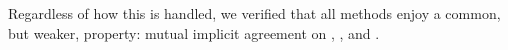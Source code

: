 \documentclass[runningheads, envcountsame, hidelinks, a4paper, draft, x11names]{llncs}
\begin{document}
Regardless of how this is handled, we verified that all methods
enjoy a common, but weaker, property: mutual implicit agreement
on \mGxy, \mGiy, and \mGrx.
%

%
%

\end{document}
